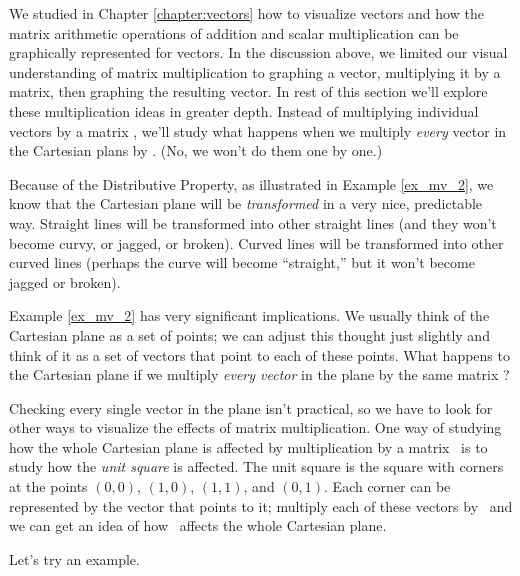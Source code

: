 We studied in Chapter \ref{chapter:vectors} how to visualize vectors and how the matrix arithmetic operations of addition and scalar multiplication can be graphically represented for vectors. In the discussion above, we limited our visual understanding of matrix  multiplication to graphing a vector, multiplying it by a matrix, then graphing the resulting vector. In rest of this section we'll explore these multiplication ideas in greater depth. Instead of multiplying individual vectors by a matrix \tta, we'll study what happens when we multiply \textit{every} vector in the Cartesian plans by \tta. (No, we won't do them one by one.)

Because of the Distributive Property, as illustrated in Example \ref{ex_mv_2}, we know that the Cartesian plane will be \textit{transformed} in a very nice, predictable way. Straight lines will be transformed into other straight lines (and they won't become curvy, or jagged, or broken). Curved lines will be transformed into other curved lines (perhaps the curve will become ``straight,'' but it won't become jagged or broken).

Example \ref{ex_mv_2} has very significant implications. We usually think of the Cartesian plane as a set of points; we can adjust this thought just slightly and think of it as a set of vectors that point to each of these points. What happens to the Cartesian plane if we multiply \textit{every vector} in the plane by the same matrix \tta? 

Checking every single vector in the plane isn't practical, so we have to look for other ways to visualize the effects of matrix multiplication. One way of studying how the whole Cartesian plane is affected by multiplication by a matrix \tta\ is to study how the \textit{unit square} is affected. The unit square is the square with corners at the points $(0,0)$, $(1,0)$, $(1,1)$, and $(0,1)$. Each corner can be represented by the vector that points to it; multiply each of these vectors by \tta\ and we can get an idea of how \tta\ affects the whole Cartesian plane. 

Let's try an example.

\medskip

